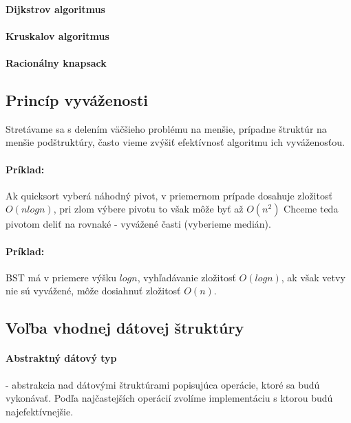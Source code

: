 		\paragraph{Dijkstrov algoritmus}
		\paragraph{Kruskalov algoritmus}
		\paragraph{Racionálny knapsack}
	\subsection{Princíp vyváženosti}
		Stretávame sa s delením väčšieho problému na menšie, prípadne štruktúr na menšie podštruktúry, často vieme zvýšiť efektívnosť algoritmu ich vyváženosťou.
		\paragraph{Príklad:} Ak quicksort vyberá náhodný pivot, v priemernom prípade dosahuje zložitosť $O(n log n)$, pri zlom výbere pivotu to však môže byť až $O(n^{2})$ Chceme teda pivotom deliť na rovnaké - vyvážené časti (vyberieme medián).\\
		\paragraph{Príklad:} BST má v priemere výšku $log n$, vyhľadávanie zložitosť $O(log n)$, ak však vetvy nie sú vyvážené, môže dosiahnuť zložitosť $O(n)$.
	

	\subsection{Voľba vhodnej dátovej štruktúry}
		\paragraph{Abstraktný dátový typ} - abstrakcia nad dátovými štruktúrami popisujúca operácie, ktoré sa budú vykonávať. Podľa najčastejších operácií zvolíme implementáciu s ktorou budú najefektívnejšie.\\


